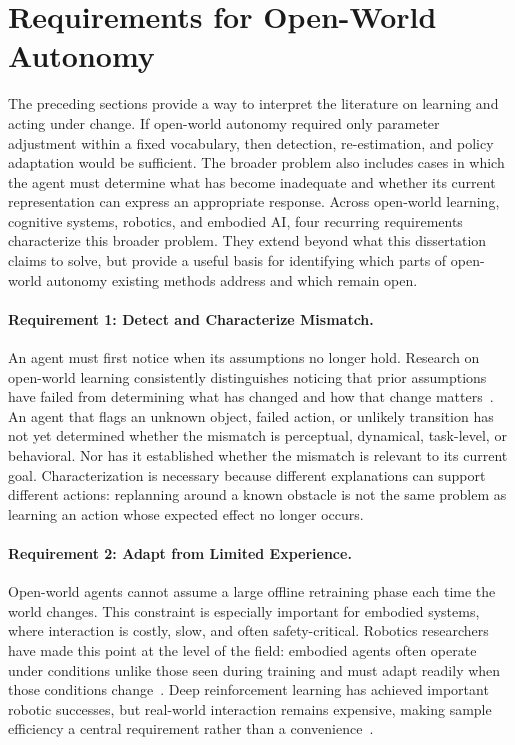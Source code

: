 
\section{Requirements for Open-World Autonomy}
\label{sec:what_is_required}

The preceding sections provide a way to interpret the literature on learning and acting under change.
If open-world autonomy required only parameter adjustment within a fixed vocabulary, then detection, re-estimation, and policy adaptation would be sufficient.
The broader problem also includes cases in which the agent must determine what has become inadequate and whether its current representation can express an appropriate response.
Across open-world learning, cognitive systems, robotics, and embodied AI, four recurring requirements characterize this broader problem.
They extend beyond what this dissertation claims to solve, but provide a useful basis for identifying which parts of open-world autonomy existing methods address and which remain open.

\paragraph{Requirement 1: Detect and Characterize Mismatch.}
An agent must first notice when its assumptions no longer hold.
Research on open-world learning consistently distinguishes noticing that prior assumptions have failed from determining what has changed and how that change matters~\citep{senator2019science,langley2020open,boult2021towards,kejriwal2024challenges}.
An agent that flags an unknown object, failed action, or unlikely transition has not yet determined whether the mismatch is perceptual, dynamical, task-level, or behavioral.
Nor has it established whether the mismatch is relevant to its current goal.
Characterization is necessary because different explanations can support different actions: replanning around a known obstacle is not the same problem as learning an action whose expected effect no longer occurs.

\paragraph{Requirement 2: Adapt from Limited Experience.}
Open-world agents cannot assume a large offline retraining phase each time the world changes.
This constraint is especially important for embodied systems, where interaction is costly, slow, and often safety-critical.
Robotics researchers have made this point at the level of the field: embodied agents often operate under conditions unlike those seen during training and must adapt readily when those conditions change~\citep{roy2021machine}.
Deep reinforcement learning has achieved important robotic successes, but real-world interaction remains expensive, making sample efficiency a central requirement rather than a convenience~\citep{tang2025deep}.

